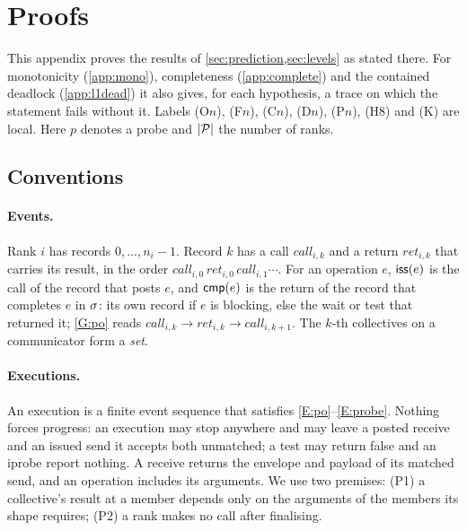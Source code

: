 \section{Proofs}
\label{app:proofs}

\providecommand{\evcall}{\mathit{call}}
\providecommand{\evret}{\mathit{ret}}

This appendix proves the results of \cref{sec:prediction,sec:levels} as stated there. For
monotonicity (\cref{app:mono}), completeness (\cref{app:complete}) and the contained deadlock
(\cref{app:l1dead}) it also gives, for each hypothesis, a trace on which the statement fails
without it. Labels (O$n$), (F$n$), (C$n$), (D$n$), (P$n$), (H8) and (K) are local. Here $p$
denotes a probe and $|\mathcal{P}|$ the number of ranks.

\subsection{Conventions}
\label{app:conv}

\paragraph{Events.}
Rank $i$ has records $0,\dots,n_i-1$. Record $k$ has a call $\evcall_{i,k}$ and a return
$\evret_{i,k}$ that carries its result, in the order $\evcall_{i,0}\,\evret_{i,0}\,
\evcall_{i,1}\cdots$. For an operation $e$, $\mathsf{iss}(e)$ is the call of the record that posts
$e$, and $\mathsf{cmp}(e)$ is the return of the record that completes $e$ in $\sigma$: its own record
if $e$ is blocking, else the wait or test that returned it; \ref{G:po} reads
$\evcall_{i,k}\to\evret_{i,k}\to\evcall_{i,k+1}$. The $k$-th collectives on a communicator
form a \emph{set}.

\paragraph{Executions.}
An execution is a finite event sequence that satisfies \ref{E:po}--\ref{E:probe}. Nothing forces
progress: an execution may stop anywhere and may leave a posted receive and an issued send it
accepts both unmatched; a test may return false and an iprobe report nothing. A receive returns
the envelope and payload of its matched send, and an operation includes its arguments. We use
two premises: (P1) a collective's result at a member depends only on the arguments of the
members its shape requires; (P2) a rank makes no call after finalising.

